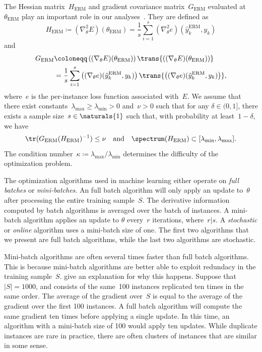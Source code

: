 \documentclass[11pt,a4paper]{article}
\numberwithin{equation}{section}
\begin{document}
The Hessian matrix~$H_{\text{ERM}}$ and gradient covariance
matrix~$G_{\text{ERM}}$ evaluated at~$\theta_{\text{ERM}}$ play an important
role in our analyses~\citep{bousquet2008tradeoffs}. They are defined as
\[
	H_{\text{ERM}} \coloneqq (\nabla_\theta^2 E)(\theta_{\text{ERM}})
	= \frac{1}{s} \sum_{i = 1}^s (\nabla_\theta^2 e)(\hat{y}_k^{\text{ERM}}, y_k)
\]
and
\begin{align*}
	G_{\text{ERM}}
	&\coloneqq \left((\nabla_\theta E)(\theta_{\text{ERM}})\right)
		\trans{\left((\nabla_\theta E)(\theta_{\text{ERM}})\right)} \\
	&= \frac{1}{s} \sum_{i = 1}^s
		\left((\nabla_\theta e)(\hat{y}_k^{\text{ERM}}, y_k)\right)
		\trans{\left((\nabla_\theta e)(\hat{y}_k^{\text{ERM}}, y_k)\right)},
\end{align*}
where~$e$ is the per-instance loss function associated with~$E$. We assume that
there exist constants~$\lambda_{\text{max}} \geq \lambda_{\text{min}} > 0$
and~$\nu > 0$ such that for any $\delta \in (0, 1]$, there exists a sample
size~$s \in \naturals{1}$ such that, with probability at least~$1 - \delta$, we
have
\[
	\tr(G_{\text{ERM}} (H_{\text{ERM}})^{-1}) \leq \nu \quad\text{and}\quad
	\spectrum(H_{\text{ERM}}) \subset [\lambda_{\text{min}}, \lambda_{\text{max}}].
\]
The condition number~$\kappa \coloneqq
\lambda_{\text{max}}/{\lambda_{\text{min}}}$ determines the difficulty of the
optimization problem.

The optimization algorithms used in machine learning either operate on
\emph{full batches} or \emph{mini-batches}. An full batch algorithm will only
apply an update to~$\theta$ after processing the entire training sample~$S$. The
derivative information computed by batch algorithms is averaged over the batch
of instances. A mini-batch algorithm applies an update to $\theta$ every~$r$
iterations, where~$r | s$. A \emph{stochastic} or \emph{online} algorithm uses a
mini-batch size of one. The first two algorithms that we present are full batch
algorithms, while the last two algorithms are stochastic.

Mini-batch algorithms are often several times faster than full batch algorithms.
This is because mini-batch algorithms are better able to exploit redundacy in
the training sample~$S$. \citet{lecun-98b} give an explanation for why this
happens. Suppose that~$|S| = 1000$, and consists of the same~100 instances
replicated ten times in the same order. The average of the gradient over~$S$ is
equal to the average of the gradient over the first 100 instances. A full batch
algorithm will compute the same gradient ten times before applying a single
update. In this time, an algorithm with a mini-batch size of 100 would apply ten
updates. While duplicate instances are rare in practice, there are often
clusters of instances that are similar in some sense.
\end{document}
